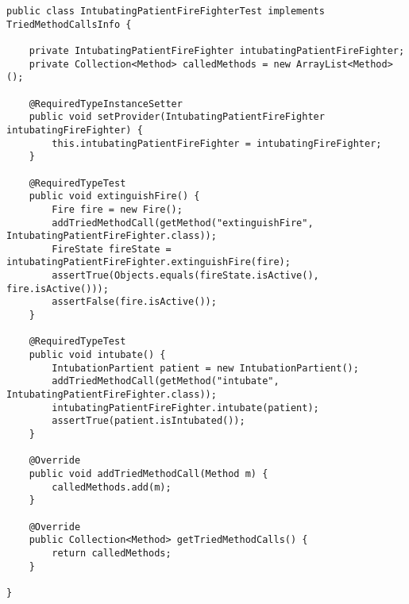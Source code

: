 \begin{lstlisting}[style = java, caption = Interface IntubatingPatientFireFighterTest, captionpos = b, label = lst_testklassen_tei6]
public class IntubatingPatientFireFighterTest implements TriedMethodCallsInfo {

	private IntubatingPatientFireFighter intubatingPatientFireFighter;
	private Collection<Method> calledMethods = new ArrayList<Method>();

	@RequiredTypeInstanceSetter
	public void setProvider(IntubatingPatientFireFighter intubatingFireFighter) {
		this.intubatingPatientFireFighter = intubatingFireFighter;
	}

	@RequiredTypeTest
	public void extinguishFire() {
		Fire fire = new Fire();
		addTriedMethodCall(getMethod("extinguishFire", IntubatingPatientFireFighter.class));
		FireState fireState = intubatingPatientFireFighter.extinguishFire(fire);
		assertTrue(Objects.equals(fireState.isActive(), fire.isActive()));
		assertFalse(fire.isActive());
	}

	@RequiredTypeTest
	public void intubate() {
		IntubationPartient patient = new IntubationPartient();
		addTriedMethodCall(getMethod("intubate", IntubatingPatientFireFighter.class));
		intubatingPatientFireFighter.intubate(patient);
		assertTrue(patient.isIntubated());
	}

	@Override
	public void addTriedMethodCall(Method m) {
		calledMethods.add(m);
	}

	@Override
	public Collection<Method> getTriedMethodCalls() {
		return calledMethods;
	}

}
\end{lstlisting}
